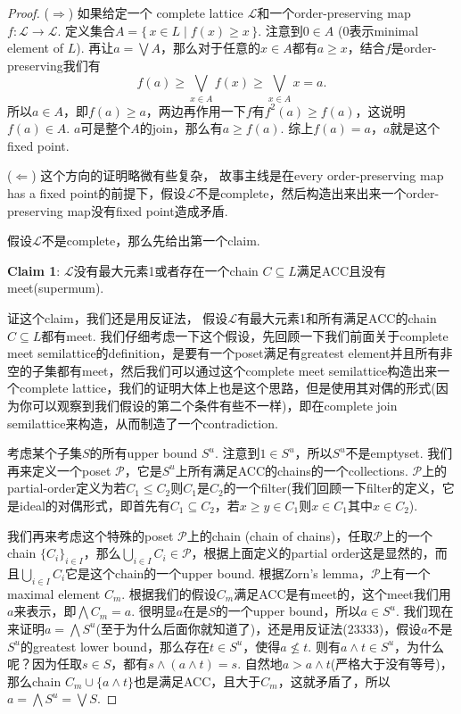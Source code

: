 \documentclass{article}
\newcommand*{\xfunc}[4]{{#2}\colon{#3}{#1}{#4}}
\newcommand*{\func}[3]{\xfunc{\to}{#1}{#2}{#3}}
\newcommand\Set[2]{\{\,#1\mid#2\,\}} %
\newcommand\lattice{\mathcal{L}}
\begin{document}
\begin{proof}
($\Rightarrow$) 如果给定一个 complete lattice $\lattice$和一个order-preserving map $\func{f}{\lattice}{\lattice}$. 定义集合$A = \Set{x \in L}{f(x) \geq x}$. 注意到$0 \in A$ (0表示minimal element of $L$). 再让$a = \bigvee A$，那么对于任意的$x \in A$都有$a \geq x$，结合$f$是order-preserving我们有
$$
f(a) \geq \bigvee\limits_{x \in A} f(x)  \geq \bigvee\limits_{x \in A} x = a.
$$
所以$a \in A$，即$f(a) \geq a$，两边再作用一下$f$有$f^2(a) \geq f(a)$，这说明$f(a) \in A$. $a$可是整个$A$的join，那么有$a \geq f(a)$. 综上$f(a) = a$，$a$就是这个fixed point.

($\Leftarrow$) 这个方向的证明略微有些复杂，{\color{blue} 故事主线是在every order-preserving map has a fixed point的前提下，假设$\lattice$不是complete，然后构造出来出来一个order-preserving map没有fixed point造成矛盾}.

假设$\lattice$不是complete，那么先给出第一个claim.

\textbf{Claim 1}: $\lattice$没有最大元素1或者存在一个chain $C \subseteq L$满足ACC且没有meet(supermum).

证这个claim，我们还是用反证法，{\color{blue} 假设$\lattice$有最大元素1和所有满足ACC的chain $C \subseteq L$都有meet}. 我们仔细考虑一下这个假设，先回顾一下我们前面关于complete meet semilattice的definition，是要有一个poset满足有greatest element并且所有非空的子集都有meet，然后我们可以通过这个complete meet semilattice构造出来一个complete lattice，我们的证明大体上也是这个思路，但是使用其对偶的形式(因为你可以观察到我们假设的第二个条件有些不一样)，即在complete join semilattice来构造，从而制造了一个contradiction.

考虑某个子集$S$的所有upper bound $S^u$. {\color{blue} 注意到$1 \in S^u$}，所以$S^u$不是emptyset. 我们再来定义一个poset $\mathcal{P}$，它是$S^u$上所有满足ACC的chains的一个collections. $\mathcal{P}$上的partial-order定义为若$C_1 \leq C_2$则$C_1$是$C_2$的一个filter(我们回顾一下filter的定义，它是ideal的对偶形式，即首先有$C_1 \subseteq C_2$，若$x \geq y \in C_1$则$x \in C_1$其中$x \in C_2$).

我们再来考虑这个特殊的poset $\mathcal{P}$上的chain (chain of chains)，任取$\mathcal{P}$上的一个chain $\{C_i\}_{i \in I}$，那么$\bigcup\limits_{i \in I} C_i \in \mathcal{P}$，根据上面定义的partial order这是显然的，而且$\bigcup\limits_{i \in I} C_i$它是这个chain的一个upper bound. 根据Zorn's lemma，$\mathcal{P}$上有一个maximal element $C_m$. {\color{blue} 根据我们的假设$C_m$满足ACC是有meet的}，这个meet我们用$a$来表示，即$\bigwedge C_m = a$. 很明显$a$在是$S$的一个upper bound，所以$a \in S^u$. {\color{blue} 我们现在来证明$a = \bigwedge S^u$}(至于为什么后面你就知道了)，还是用反证法(23333)，假设$a$不是$S^u$的greatest lower bound，那么存在$t \in S^u$，使得$a \nleq t$. 则有$a \wedge t \in S^u$，为什么呢？因为任取$s \in S$，都有$s \wedge (a \wedge t) = s$. 自然地$a > a \wedge t$(严格大于没有等号)，那么chain $C_m \cup \{a \wedge t\}$也是满足ACC，且大于$C_m$，这就矛盾了，所以$a = \bigwedge S^u = \bigvee S$. 


\end{proof}
\end{document}

